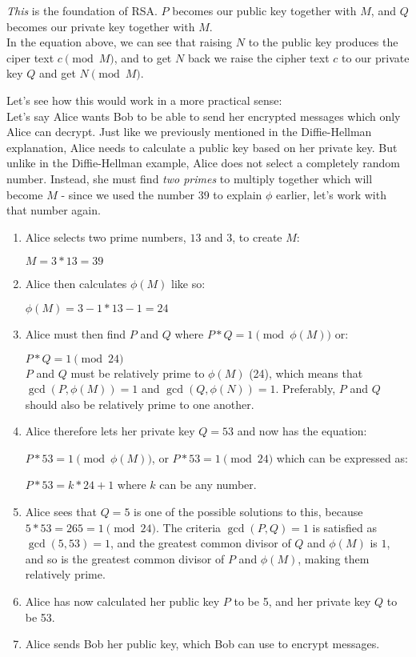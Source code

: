 \textit{This} is the foundation of RSA. $P$ becomes our public key together with $M$, and $Q$ becomes our private key together with $M$.\cite{rsaKeyTypes,rsaKeyGen}\\

In the equation above, we can see that raising $N$ to the public key produces the ciper text $c \pmod{M}$, and to get $N$ back we raise the cipher text $c$ to our private key $Q$ and get $N \pmod{M}$.

Let's see how this would work in a more practical sense: \\

Let's say Alice wants Bob to be able to send her encrypted messages which only Alice can decrypt. Just like we previously mentioned in the Diffie-Hellman explanation, Alice needs to calculate a public key based on her private key. But unlike in the Diffie-Hellman example, Alice does not select a completely random number. Instead, she must find \textit{two primes} to multiply together which will become $M$ - since we used the number 39 to explain $\phi$ earlier, let's work with that number again.
\begin{enumerate}
	\item Alice selects two prime numbers, $13$ and $3$, to create $M$:

\indent $M = 3*13 = 39$

	\item Alice then calculates $\phi(M)$ like so:
	
\indent $\phi(M) = 3-1 * 13-1 = 24$
 
	\item Alice must then find $P$ and $Q$ where $P*Q = 1 \pmod{\phi(M)}$ or:

\indent $P*Q = 1 \pmod{24}$ \\

$P$ and $Q$ must be relatively prime to $\phi(M)$ (24), which means that $\gcd(P,\phi(M)) = 1$ and $\gcd(Q,\phi(N)) = 1$. Preferably, $P$ and $Q$ should also be relatively prime to one another.\\

	\item Alice therefore lets her private key $Q = 53$ and now has the equation:
	
\indent $ P*53 = 1 \pmod{\phi(M)}$, or $P*53 = 1 \pmod{24}$ which can be expressed as:

\indent $P*53 = k * 24 +1$ where $k$ can be any number.

	\item Alice sees that $Q = 5$ is one of the possible solutions to this, because $5*53 = 265 = 1 \pmod{24}$. The criteria $\gcd(P,Q) = 1$ is satisfied as $\gcd(5,53) = 1$, and the greatest common divisor of $Q$ and $\phi(M)$ is $1$, and so is the greatest common divisor of $P$ and $\phi(M)$, making them relatively prime.

	\item Alice has now calculated her public key $P$ to be 5, and her private key $Q$ to be 53.

	\item Alice sends Bob her public key, which Bob can use to encrypt messages.
	
\end{enumerate} 

